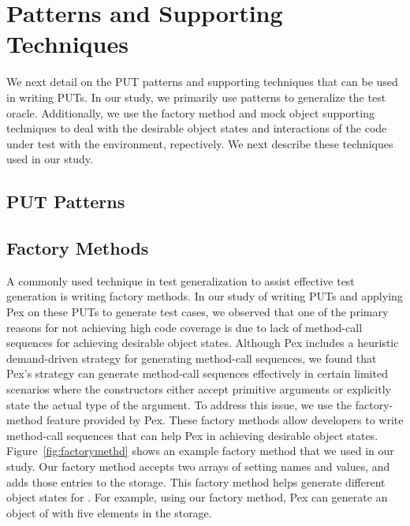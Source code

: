 \section{Patterns and Supporting Techniques}
\label{sec:helper}

We next detail on the PUT patterns and supporting techniques that can be used in writing PUTs. In our study, we primarily use patterns to generalize the test oracle. Additionally, we use the factory method and mock object supporting techniques to deal with the desirable object states and interactions of the code under test with the environment, repectively. We next describe these techniques used in our study.
\subsection{PUT Patterns} 
\label{sec:patterns}
\subsection{Factory Methods} 
\label{sec:factory}

A commonly used technique in test generalization to assist effective test generation is writing factory methods. In our study of writing PUTs and applying Pex on these PUTs to generate test cases, we observed that one of the primary reasons for not achieving high code coverage is due to lack of method-call sequences for achieving desirable object states. Although Pex includes a heuristic demand-driven strategy for generating method-call sequences, we found that Pex's strategy can generate method-call sequences effectively in certain limited scenarios where the constructors either accept primitive arguments or explicitly state the actual type of the argument. To address this issue, we use the factory-method feature provided by Pex. These factory methods allow developers to write method-call sequences that can help Pex in achieving desirable object states. Figure~\ref{fig:factorymethd} shows an example factory method that we used in our study. Our factory method accepts two arrays of setting names and values, and adds those entries to the storage. This factory method helps generate different object states for . For example, using our factory method, Pex can generate an object of  with five elements in the storage. 
